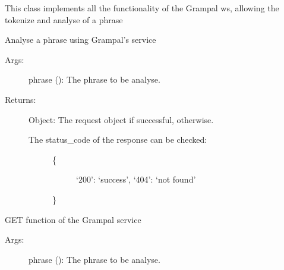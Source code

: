 \documentclass[letterpaper,10pt,english]{sphinxmanual}
\begin{document}
\begin{fulllineitems}
\label{\detokenize{ws:ws.Grampal}}

This class implements all the functionality of the Grampal ws, allowing the tokenize and analyse of a phrase

\begin{fulllineitems}
\label{\detokenize{ws:ws.Grampal.analiza}}
Analyse a phrase using Grampal’s service
\begin{description}
\item[{Args:}] \leavevmode
phrase (): The phrase to be analyse.

\item[{Returns:}] \leavevmode
Object: The request object if successful,  otherwise.
\begin{description}
\item[{The status\_code of the response can be checked:}] \leavevmode\begin{description}
\item[{\{}] \leavevmode
‘200’: ‘success’,                                       ‘404’: ‘not found’

\end{description}

\}

\end{description}

\end{description}

\end{fulllineitems}


\begin{fulllineitems}
\label{\detokenize{ws:ws.Grampal.analiza_get}}
GET function of the Grampal service
\begin{description}
\item[{Args:}] \leavevmode
phrase (): The phrase to be analyse.


\end{description}
\end{fulllineitems}
\end{fulllineitems}
\end{document}
